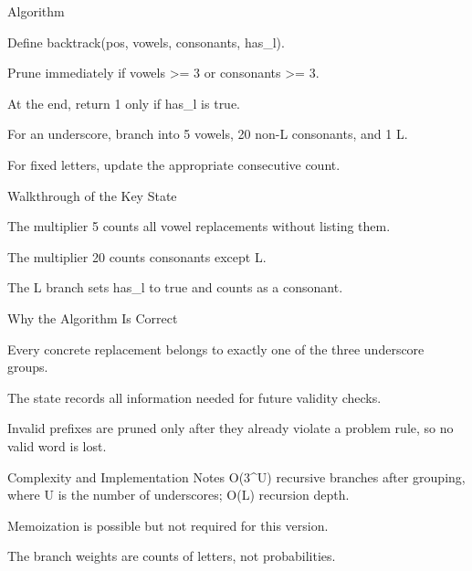 \documentclass[aspectratio=169,11pt]{beamer}
\begin{document}
\begin{frame}{Algorithm}
\begin{tightitemize}
  \item Define backtrack(pos, vowels, consonants, has\_l).
  \item Prune immediately if vowels >= 3 or consonants >= 3.
  \item At the end, return 1 only if has\_l is true.
  \item For an underscore, branch into 5 vowels, 20 non-L consonants, and 1 L.
  \item For fixed letters, update the appropriate consecutive count.
\end{tightitemize}
\end{frame}

\begin{frame}{Walkthrough of the Key State}
\begin{tightitemize}
  \item The multiplier 5 counts all vowel replacements without listing them.
  \item The multiplier 20 counts consonants except L.
  \item The L branch sets has\_l to true and counts as a consonant.
\end{tightitemize}
\end{frame}

\begin{frame}{Why the Algorithm Is Correct}
\begin{tightitemize}
  \item Every concrete replacement belongs to exactly one of the three underscore groups.
  \item The state records all information needed for future validity checks.
  \item Invalid prefixes are pruned only after they already violate a problem rule, so no valid word is lost.
\end{tightitemize}
\end{frame}

\begin{frame}{Complexity and Implementation Notes}
\small
{} O(3\textasciicircum{}U) recursive branches after grouping, where U is the number of underscores; O(L) recursion depth.

\vspace{0.3cm}
\begin{tightitemize}
  \item Memoization is possible but not required for this version.
  \item The branch weights are counts of letters, not probabilities.
\end{tightitemize}
\end{frame}
\end{document}
